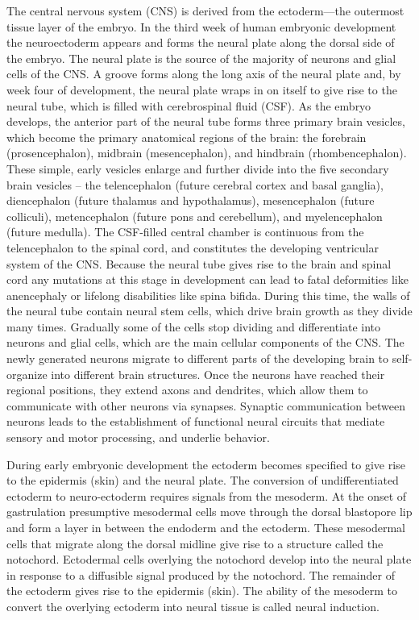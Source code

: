 \documentclass[]{book}
\begin{document}
The central nervous system (CNS) is derived from the ectoderm---the outermost tissue layer of the embryo. In the third week of human embryonic development the neuroectoderm appears and forms the neural plate along the dorsal side of the embryo. The neural plate is the source of the majority of neurons and glial cells of the CNS. A groove forms along the long axis of the neural plate and, by week four of development, the neural plate wraps in on itself to give rise to the neural tube, which is filled with cerebrospinal fluid (CSF). As the embryo develops, the anterior part of the neural tube forms three primary brain vesicles, which become the primary anatomical regions of the brain: the forebrain (prosencephalon), midbrain (mesencephalon), and hindbrain (rhombencephalon). These simple, early vesicles enlarge and further divide into the five secondary brain vesicles -- the telencephalon (future cerebral cortex and basal ganglia), diencephalon (future thalamus and hypothalamus), mesencephalon (future colliculi), metencephalon (future pons and cerebellum), and myelencephalon (future medulla). The CSF-filled central chamber is continuous from the telencephalon to the spinal cord, and constitutes the developing ventricular system of the CNS. Because the neural tube gives rise to the brain and spinal cord any mutations at this stage in development can lead to fatal deformities like anencephaly or lifelong disabilities like spina bifida. During this time, the walls of the neural tube contain neural stem cells, which drive brain growth as they divide many times. Gradually some of the cells stop dividing and differentiate into neurons and glial cells, which are the main cellular components of the CNS. The newly generated neurons migrate to different parts of the developing brain to self-organize into different brain structures. Once the neurons have reached their regional positions, they extend axons and dendrites, which allow them to communicate with other neurons via synapses. Synaptic communication between neurons leads to the establishment of functional neural circuits that mediate sensory and motor processing, and underlie behavior.

During early embryonic development the ectoderm becomes specified to give rise to the epidermis (skin) and the neural plate. The conversion of undifferentiated ectoderm to neuro-ectoderm requires signals from the mesoderm. At the onset of gastrulation presumptive mesodermal cells move through the dorsal blastopore lip and form a layer in between the endoderm and the ectoderm. These mesodermal cells that migrate along the dorsal midline give rise to a structure called the notochord. Ectodermal cells overlying the notochord develop into the neural plate in response to a diffusible signal produced by the notochord. The remainder of the ectoderm gives rise to the epidermis (skin). The ability of the mesoderm to convert the overlying ectoderm into neural tissue is called neural induction.
\end{document}
